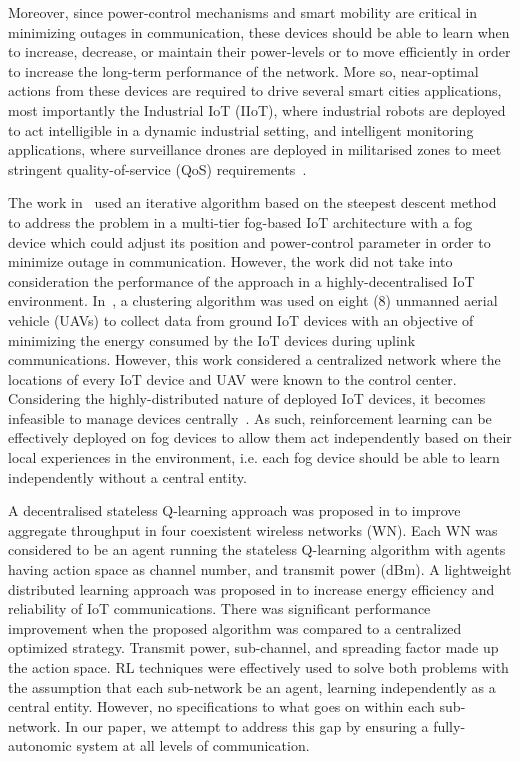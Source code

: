 \documentclass[journal]{IEEEtran}
\begin{document}
Moreover, since power-control mechanisms and smart mobility are critical in minimizing outages in communication, these devices should be able to learn when to increase, decrease, or maintain their power-levels or to move efficiently in order to increase the long-term performance of the network. More so, near-optimal actions from these devices are required to drive several smart cities applications, most importantly the Industrial IoT (IIoT), where industrial robots are deployed to act intelligible in a dynamic industrial setting, and intelligent monitoring applications, where surveillance drones are deployed in militarised zones to meet stringent quality-of-service (QoS) requirements~\cite{OmoniwaRelay2018}.

The work in~\cite{OmoniwaRelay2018} used an iterative algorithm based on the steepest descent method to address the problem in a multi-tier fog-based IoT architecture with a fog device which could adjust its position and power-control parameter in order to minimize outage in communication. However, the work did not take into consideration the performance of the approach in a highly-decentralised IoT environment. In~\cite{Mozaffari2016}, a clustering algorithm was used on eight (8) unmanned aerial vehicle (UAVs) to collect data from ground IoT devices with an objective of minimizing the energy consumed by the IoT devices during uplink communications. However, this work considered a centralized network where the locations of every IoT device and UAV were known to the control center. Considering the highly-distributed nature of deployed IoT devices, it becomes infeasible to manage devices centrally~\cite{Wilhelmi2017}. As such, reinforcement learning can be effectively deployed on fog devices to allow them act independently based on their local experiences in the environment, i.e. each fog device should be able to learn independently without a central entity.

A decentralised stateless Q-learning approach was proposed in \cite{Wilhelmi2017} to improve aggregate throughput in four coexistent wireless networks (WN). Each WN was considered to be an agent running the stateless Q-learning algorithm with agents having action space as channel number, and transmit power
(dBm). A lightweight distributed learning approach was proposed in \cite{Azari2018} to increase energy efficiency and reliability of IoT communications. There was significant performance improvement when the proposed algorithm was compared to a centralized optimized strategy. Transmit power, sub-channel, and spreading factor made up the action space. RL techniques were effectively used to solve both problems with the assumption that each sub-network be an agent, learning independently as a central entity. However, no specifications to what goes on within each sub-network. In our paper, we attempt to address this gap by ensuring a fully-autonomic system at all levels of communication.
\end{document}
